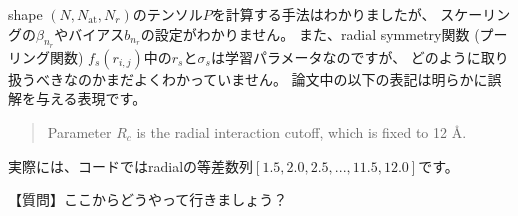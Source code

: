 \documentclass[12pt,a4paer]{jarticle}
\begin{document}
shape $(N, N_{\mathrm{at}}, N_r)$のテンソル$P$を計算する手法はわかりましたが、
スケーリングの$\beta_{n_r}$やバイアス$b_{n_r}$の設定がわかりません。
また、radial symmetry関数 (プーリング関数) $f_s(r_{i,j})$中の$r_s$と$\sigma_s$は学習パラメータなのですが、
どのように取り扱うべきなのかまだよくわかっていません。
論文中の以下の表記は明らかに誤解を与える表現です。

\begin{quote}
Parameter $R_c$ is the radial interaction cutoff, which is fixed to 12 \AA.
\end{quote}

実際には、コードではradialの等差数列$[1.5, 2.0, 2.5, ..., 11.5, 12.0]$です。

\vspace{1cm}

【質問】ここからどうやって行きましょう？
\end{document}
